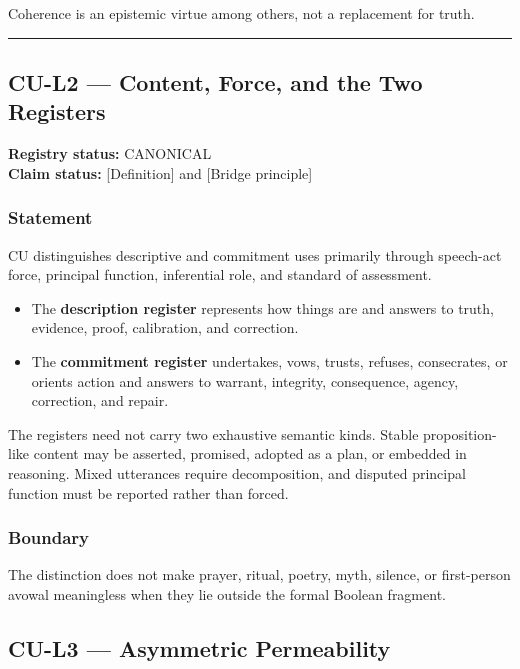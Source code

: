 \documentclass[
  11pt,
]{article}
\providecommand{\tightlist}{%
  \setlength{\itemsep}{0pt}\setlength{\parskip}{0pt}}
\begin{document}
Coherence is an epistemic virtue among others, not a replacement for
truth.

\begin{center}\rule{0.5\linewidth}{0.5pt}\end{center}

\subsection{CU-L2 --- Content, Force, and the Two
Registers}\label{cu-l2-content-force-and-the-two-registers}

\textbf{Registry status:} CANONICAL\\
\textbf{Claim status:} {[}Definition{]} and {[}Bridge principle{]}

\subsubsection{Statement}\label{statement-25}

CU distinguishes descriptive and commitment uses primarily through
speech-act force, principal function, inferential role, and standard of
assessment.

\begin{itemize}
\tightlist
\item
  The \textbf{description register} represents how things are and
  answers to truth, evidence, proof, calibration, and correction.
\item
  The \textbf{commitment register} undertakes, vows, trusts, refuses,
  consecrates, or orients action and answers to warrant, integrity,
  consequence, agency, correction, and repair.
\end{itemize}

The registers need not carry two exhaustive semantic kinds. Stable
proposition-like content may be asserted, promised, adopted as a plan,
or embedded in reasoning. Mixed utterances require decomposition, and
disputed principal function must be reported rather than forced.

\subsubsection{Boundary}\label{boundary}

The distinction does not make prayer, ritual, poetry, myth, silence, or
first-person avowal meaningless when they lie outside the formal Boolean
fragment.

\subsection{CU-L3 --- Asymmetric
Permeability}\label{cu-l3-asymmetric-permeability}
\end{document}
